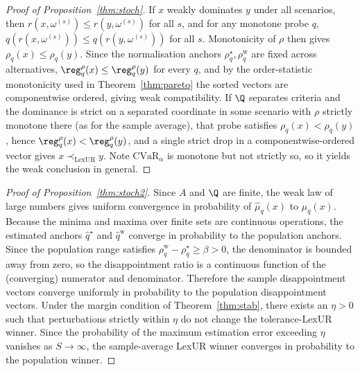 \begin{proof}[Proof of Proposition~\ref{thm:stoch}]
If $x$ weakly dominates $y$ under all scenarios, then $r(x, \omega^{(s)}) \le r(y, \omega^{(s)})$ for all $s$, and for any monotone probe $q$, $q(r(x, \omega^{(s)})) \le q(r(y, \omega^{(s)}))$ for all $s$. Monotonicity of $\rho$ then gives $\rho_q(x)\le\rho_q(y)$. Since the normalisation anchors $\rho_q^\star,\rho_q^{\mathrm w}$ are fixed across alternatives, $\reg_q^\rho(x)\le\reg_q^\rho(y)$ for every $q$, and by the order-statistic monotonicity used in Theorem~\ref{thm:pareto} the sorted vectors are componentwise ordered, giving weak compatibility. If $\Q$ separates criteria and the dominance is strict on a separated coordinate in some scenario with $\rho$ strictly monotone there (as for the sample average), that probe satisfies $\rho_q(x)<\rho_q(y)$, hence $\reg_q^\rho(x)<\reg_q^\rho(y)$, and a single strict drop in a componentwise-ordered vector gives $x\prec_{\mathrm{LexUR}}y$. Note $\mathrm{CVaR}_\alpha$ is monotone but not strictly so, so it yields the weak conclusion in general.
\end{proof}

\begin{proof}[Proof of Proposition~\ref{thm:stoch2}]
Since $A$ and $\Q$ are finite, the weak law of large numbers gives uniform convergence in probability of $\hat{\mu}_q(x)$ to $\mu_q(x)$. Because the minima and maxima over finite sets are continuous operations, the estimated anchors $\hat{q}^\star$ and $\hat{q}^{\mathrm w}$ converge in probability to the population anchors. Since the population range satisfies $\rho_q^{\mathrm w}-\rho_q^\star\ge\beta>0$, the denominator is bounded away from zero, so the disappointment ratio is a continuous function of the (converging) numerator and denominator. Therefore the sample disappointment vectors converge uniformly in probability to the population disappointment vectors. Under the margin condition of Theorem~\ref{thm:stab}, there exists an $\eta > 0$ such that perturbations strictly within $\eta$ do not change the tolerance-LexUR winner. Since the probability of the maximum estimation error exceeding $\eta$ vanishes as $S\to\infty$, the sample-average LexUR winner converges in probability to the population winner.
\end{proof}
